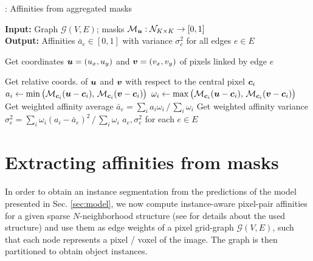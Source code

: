 \begin{algorithm}[t]
  \begin{flushleft}
  \caption{: Affinities from aggregated \maskname masks}
   \hspace*{\algorithmicindent} \textbf{Input:} Graph $\mathcal{G}(V,E)$; \maskname masks $\mathcal{M}_{\coord{u}}: \mathcal{N}_{K\times K} \rightarrow [0,1]$  \\
  \hspace*{\algorithmicindent} \textbf{Output:} Affinities $\bar{a}_e\in[0,1]$ with variance $\sigma^2_e$ for all edges $e\in E$\\
  \hspace*{\algorithmicindent} 
  \begin{algorithmic}[1]
  \footnotesize
        \State Get coordinates $\coord{u}=(u_x,u_y)$ and $\coord{v}=(v_x,v_y)$ of pixels linked by edge $e$

            \State Get relative coords. of $\coord{u}$ and $\coord{v}$ with respect to the central pixel $\coord{c}_i$
            \State $a_i \gets \min \big(\mathcal{M}_{\coord{c}_i}(\coord{u} - \coord{c}_i), \,\mathcal{M}_{\coord{c}_i}(\coord{v} - \coord{c}_i)\big)$ 
            \State $\omega_i \gets \max \big(\mathcal{M}_{\coord{c}_i}(\coord{u} - \coord{c}_i), \,\mathcal{M}_{\coord{c}_i}(\coord{v} - \coord{c}_i)\big)$ 
        \EndFor
        \State Get weighted affinity average $\bar{a}_e= \sum_{i} a_i \omega_i\,/\,\sum_{i}\omega_i$ 
        \State Get weighted affinity variance $\sigma^2_e = \sum_{i} \omega_i (a_i-\bar{a}_e)^2\,/\,\sum_{i}\omega_i$
      \EndFor
      \State
      \Return $a_e, \sigma^2_e$ for each $e\in E$
  \end{algorithmic}
    \label{computing_affinities}
  \end{flushleft}

\end{algorithm}

\section{Extracting affinities from \maskname masks}
In order to obtain an instance segmentation from the predictions of the model presented in Sec. \ref{sec:model}, we now compute instance-aware pixel-pair affinities for a given sparse $N$-neighborhood structure (see  for details about the used structure) and use them as edge weights of a pixel grid-graph $\mathcal{G}(V,E)$, such that each node represents a pixel / voxel of the image. The graph is then partitioned to obtain object instances.

